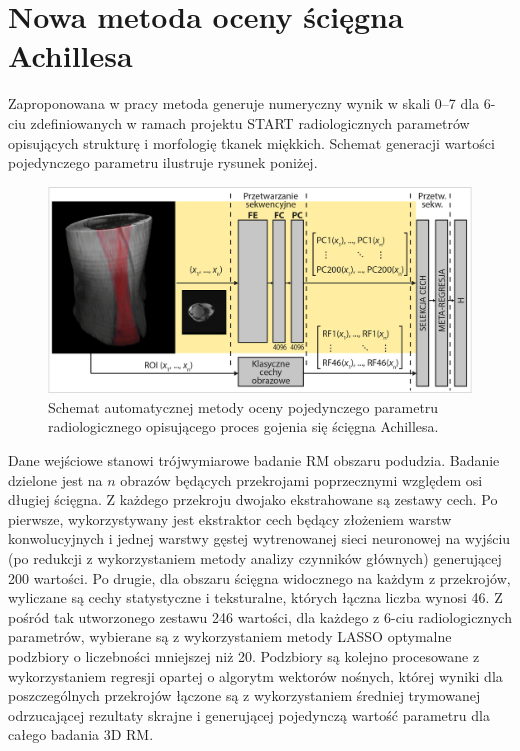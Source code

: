 {\let\clearpage\relax\chapter*{Nowa metoda oceny ścięgna Achillesa}}

Zaproponowana w pracy metoda generuje numeryczny wynik w skali 0--7 dla 6-ciu zdefiniowanych w ramach projektu START radiologicznych parametrów opisujących strukturę i morfologię tkanek miękkich. Schemat generacji wartości pojedynczego parametru ilustruje rysunek poniżej. 
\begin{figure}[h!]
	\includegraphics[width=\textwidth]{figures/net.jpg}
	\caption{Schemat automatycznej metody oceny pojedynczego parametru radiologicznego opisującego proces gojenia się ścięgna Achillesa.} \label{fig:net}
\end{figure}

Dane wejściowe stanowi trójwymiarowe badanie RM obszaru podudzia. Badanie dzielone jest na $n$ obrazów będących przekrojami poprzecznymi względem osi długiej ścięgna. Z każdego przekroju dwojako ekstrahowane są zestawy cech. Po pierwsze, wykorzystywany jest ekstraktor cech będący złożeniem warstw konwolucyjnych i jednej warstwy gęstej wytrenowanej sieci neuronowej na wyjściu (po redukcji z wykorzystaniem metody analizy czynników głównych) generującej 200 wartości. Po drugie, dla obszaru ścięgna widocznego na każdym z przekrojów, wyliczane są cechy statystyczne i teksturalne, których łączna liczba wynosi 46. Z pośród tak utworzonego zestawu 246 wartości, dla każdego z 6-ciu radiologicznych parametrów, wybierane są z wykorzystaniem metody LASSO optymalne podzbiory o liczebności mniejszej niż 20. Podzbiory są kolejno procesowane z wykorzystaniem regresji opartej o algorytm wektorów nośnych, której wyniki dla poszczególnych przekrojów łączone są z wykorzystaniem średniej trymowanej odrzucającej rezultaty skrajne i generującej pojedynczą wartość parametru dla całego badania 3D RM.   


